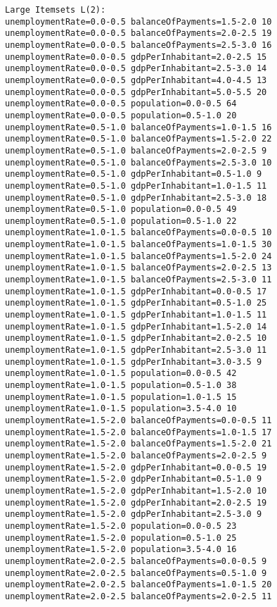 \begin{lstlisting}[basicstyle=\footnotesize\ttfamily,numbers=none]
Large Itemsets L(2):
unemploymentRate=0.0-0.5 balanceOfPayments=1.5-2.0 10
unemploymentRate=0.0-0.5 balanceOfPayments=2.0-2.5 19
unemploymentRate=0.0-0.5 balanceOfPayments=2.5-3.0 16
unemploymentRate=0.0-0.5 gdpPerInhabitant=2.0-2.5 15
unemploymentRate=0.0-0.5 gdpPerInhabitant=2.5-3.0 14
unemploymentRate=0.0-0.5 gdpPerInhabitant=4.0-4.5 13
unemploymentRate=0.0-0.5 gdpPerInhabitant=5.0-5.5 20
unemploymentRate=0.0-0.5 population=0.0-0.5 64
unemploymentRate=0.0-0.5 population=0.5-1.0 20
unemploymentRate=0.5-1.0 balanceOfPayments=1.0-1.5 16
unemploymentRate=0.5-1.0 balanceOfPayments=1.5-2.0 22
unemploymentRate=0.5-1.0 balanceOfPayments=2.0-2.5 9
unemploymentRate=0.5-1.0 balanceOfPayments=2.5-3.0 10
unemploymentRate=0.5-1.0 gdpPerInhabitant=0.5-1.0 9
unemploymentRate=0.5-1.0 gdpPerInhabitant=1.0-1.5 11
unemploymentRate=0.5-1.0 gdpPerInhabitant=2.5-3.0 18
unemploymentRate=0.5-1.0 population=0.0-0.5 49
unemploymentRate=0.5-1.0 population=0.5-1.0 22
unemploymentRate=1.0-1.5 balanceOfPayments=0.0-0.5 10
unemploymentRate=1.0-1.5 balanceOfPayments=1.0-1.5 30
unemploymentRate=1.0-1.5 balanceOfPayments=1.5-2.0 24
unemploymentRate=1.0-1.5 balanceOfPayments=2.0-2.5 13
unemploymentRate=1.0-1.5 balanceOfPayments=2.5-3.0 11
unemploymentRate=1.0-1.5 gdpPerInhabitant=0.0-0.5 17
unemploymentRate=1.0-1.5 gdpPerInhabitant=0.5-1.0 25
unemploymentRate=1.0-1.5 gdpPerInhabitant=1.0-1.5 11
unemploymentRate=1.0-1.5 gdpPerInhabitant=1.5-2.0 14
unemploymentRate=1.0-1.5 gdpPerInhabitant=2.0-2.5 10
unemploymentRate=1.0-1.5 gdpPerInhabitant=2.5-3.0 11
unemploymentRate=1.0-1.5 gdpPerInhabitant=3.0-3.5 9
unemploymentRate=1.0-1.5 population=0.0-0.5 42
unemploymentRate=1.0-1.5 population=0.5-1.0 38
unemploymentRate=1.0-1.5 population=1.0-1.5 15
unemploymentRate=1.0-1.5 population=3.5-4.0 10
unemploymentRate=1.5-2.0 balanceOfPayments=0.0-0.5 11
unemploymentRate=1.5-2.0 balanceOfPayments=1.0-1.5 17
unemploymentRate=1.5-2.0 balanceOfPayments=1.5-2.0 21
unemploymentRate=1.5-2.0 balanceOfPayments=2.0-2.5 9
unemploymentRate=1.5-2.0 gdpPerInhabitant=0.0-0.5 19
unemploymentRate=1.5-2.0 gdpPerInhabitant=0.5-1.0 9
unemploymentRate=1.5-2.0 gdpPerInhabitant=1.5-2.0 10
unemploymentRate=1.5-2.0 gdpPerInhabitant=2.0-2.5 19
unemploymentRate=1.5-2.0 gdpPerInhabitant=2.5-3.0 9
unemploymentRate=1.5-2.0 population=0.0-0.5 23
unemploymentRate=1.5-2.0 population=0.5-1.0 25
unemploymentRate=1.5-2.0 population=3.5-4.0 16
unemploymentRate=2.0-2.5 balanceOfPayments=0.0-0.5 9
unemploymentRate=2.0-2.5 balanceOfPayments=0.5-1.0 9
unemploymentRate=2.0-2.5 balanceOfPayments=1.0-1.5 20
unemploymentRate=2.0-2.5 balanceOfPayments=2.0-2.5 11

\end{lstlisting}
